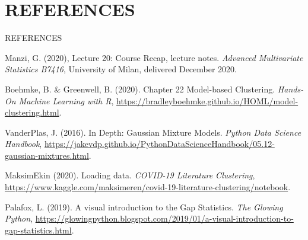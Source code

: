 \documentclass[9pt]{beamer}
\begin{document}
\section{REFERENCES}
\begin{frame}{REFERENCES}

Manzi, G. (2020), Lecture 20: Course Recap, lecture notes. \textit{Advanced Multivariate Statistics B7416}, University of Milan, delivered December 2020.

 Boehmke, B. \& Greenwell, B. (2020).  Chapter 22 Model-based Clustering. \textit{Hands-On Machine Learning with R}, \url{https://bradleyboehmke.github.io/HOML/model-clustering.html}.
 
 VanderPlas, J. (2016).  In Depth: Gaussian Mixture Models.  \textit{Python Data Science Handbook}, \url{https://jakevdp.github.io/PythonDataScienceHandbook/05.12-gaussian-mixtures.html}.

 MaksimEkin (2020).  Loading data. \textit{COVID-19 Literature Clustering}, \url{https://www.kaggle.com/maksimeren/covid-19-literature-clustering/notebook}.
 
 Palafox, L. (2019).  A visual introduction to the Gap Statistics. \textit{The Glowing Python}, \url{https://glowingpython.blogspot.com/2019/01/a-visual-introduction-to-gap-statistics.html}.

\end{frame}
    
\end{document}
